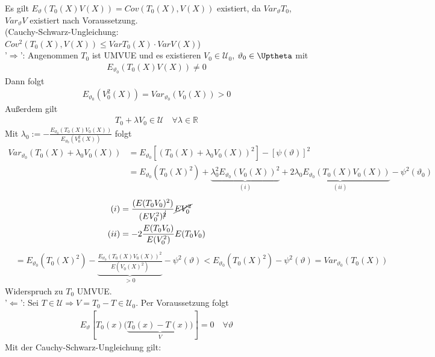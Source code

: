 \documentclass[a4paper,openany]{book}
\theoremstyle{mytheoremstyle}
\theoremstyle{mytheoremstyle2}
\newtheorem*{cbew}{Beweis}
\newenvironment{bew}[1][]{%
  \ifthenelse{\boolean{showbew}}{%
    \begin{cbew}[#1]%
  }{%
    \expandafter\comment%
  }%
}{%
  \ifthenelse{\boolean{showbew}}{%
    \end{cbew}%
  }{%
    \expandafter\endcomment%
  }%
}
\begin{document}
\begin{bew}[]
  Es gilt $E _{\vartheta }(T_0(X)V(X))=Cov(T_0(X),V(X))$ existiert, da $Var _{\vartheta }T_0$, $Var _{\vartheta }V$ existiert nach Voraussetzung. \\
  (Cauchy-Schwarz-Ungleichung: $Cov^2(T_0(X),V(X))\leq Var T_0(X) \cdot Var V(X)$) \\
  '$\Rightarrow $': Angenommen $T_0$ ist UMVUE und es existieren $V_0 \in \mathcal{U}_0$, $\vartheta_0 \in \Uptheta$ mit 
  \begin{align*}
    E _{\vartheta_0 }(T_0(X)V(X)) \neq 0
  \end{align*}
  Dann folgt 
  \begin{align*}
    E _{\vartheta _0}(V_0^2(X))=Var _{\vartheta _0}(V_0(X))>0
  \end{align*}
  Außerdem gilt 
  \begin{align*}
    T_0+\lambda V_0 \in \mathcal{U}\quad \forall \lambda \in \mathbb{R}
  \end{align*}
  Mit $\lambda _0:=-\frac{E _{\vartheta _0}(T_0(X)V_0(X))}{E _{\vartheta _0}(V_0^2(X))}$ folgt 
  \begin{align*}
    Var _{\vartheta _0}(T_0(X)+\lambda _0V_0(X))
    &=E _{\vartheta _0}[(T_0(X)+\lambda _0V_0(X))^2]-[\psi (\vartheta )]^2 \\
    &=E _{\vartheta _0}(T_0(X)^2)+\underbrace{\lambda _0^2E _{\vartheta _0}(V_0(X))^2}_{(i)}+\underbrace{2 \lambda _0E _{\vartheta _0}(T_0(X)V_0(X))}_{(ii)}-\psi ^2(\vartheta _0)
  \end{align*}
  \begin{align*}
    (i)&=\frac{(E(T_0V_0)^{{2}})}{(EV_0^2)^{\cancel{2}}}\cancel{EV_0^{{2}}} \\
  (ii)&=-2 \frac{E(T_0V_0)}{E(V_0^2)}E(T_0V_0)
  \end{align*}
  \begin{align*}
     &=E _{\vartheta _0}(T_0(X)^2)-\underbrace{\frac{E _{\vartheta_0 }(T_0(X)V_0(X))^2}{E(V_0(X)^2)}}_{>0}-\psi ^2(\vartheta ) <E _{\vartheta _0}(T_0(X)^2)-\psi ^2(\vartheta )=Var _{\vartheta _0}(T_0(X))  \end{align*}
  Widerspruch zu $T_0$ UMVUE. \\
  '$\Leftarrow$': Sei $T \in \mathcal{U}\Rightarrow V=T_0-T \in \mathcal{U}_0$. Per Voraussetzung folgt
  \begin{align*}
    E _{\vartheta }[T_0(x)(\underbrace{T_0(x)-T(x))}_{V}]=0 \quad \forall \vartheta  
  \end{align*}
  Mit der Cauchy-Schwarz-Ungleichung gilt:
  \begin{align*}

\end{align*}
\end{bew}
\end{document}
